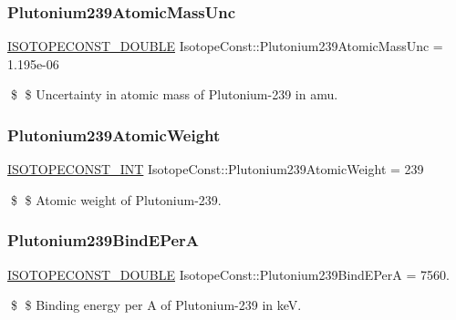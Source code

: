 \subsubsection{\texorpdfstring{Plutonium239\+Atomic\+Mass\+Unc}{Plutonium239AtomicMassUnc}}
{\footnotesize\ttfamily \mbox{\hyperlink{group___isotope_const-_macros_ga8f45a7272ce02c0b4c65c44636ed719a}{I\+S\+O\+T\+O\+P\+E\+C\+O\+N\+S\+T\+\_\+\+D\+O\+U\+B\+LE}} Isotope\+Const\+::\+Plutonium239\+Atomic\+Mass\+Unc = 1.\+195e-\/06}

\$ \$ Uncertainty in atomic mass of Plutonium-\/239 in amu. \mbox{\label{group___isotope_const-_plutonium-_pu239_ga66cb8b80442320d299f03a06faa78eb6}} 
\subsubsection{\texorpdfstring{Plutonium239\+Atomic\+Weight}{Plutonium239AtomicWeight}}
{\footnotesize\ttfamily \mbox{\hyperlink{group___isotope_const-_macros_ga5f18360b3e99483a35c32d789e62621c}{I\+S\+O\+T\+O\+P\+E\+C\+O\+N\+S\+T\+\_\+\+I\+NT}} Isotope\+Const\+::\+Plutonium239\+Atomic\+Weight = 239}

\$ \$ Atomic weight of Plutonium-\/239. \mbox{\label{group___isotope_const-_plutonium-_pu239_gacdb03d668c6279fdbf5efa865edd16f6}} 
\subsubsection{\texorpdfstring{Plutonium239\+Bind\+E\+PerA}{Plutonium239BindEPerA}}
{\footnotesize\ttfamily \mbox{\hyperlink{group___isotope_const-_macros_ga8f45a7272ce02c0b4c65c44636ed719a}{I\+S\+O\+T\+O\+P\+E\+C\+O\+N\+S\+T\+\_\+\+D\+O\+U\+B\+LE}} Isotope\+Const\+::\+Plutonium239\+Bind\+E\+PerA = 7560.}

\$ \$ Binding energy per A of Plutonium-\/239 in keV. \mbox{\label{group___isotope_const-_plutonium-_pu239_ga1290655e6368fcd6abe807faaaee4bf7}} 
